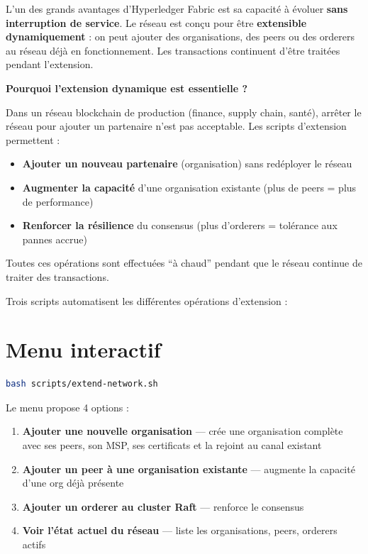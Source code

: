 \documentclass[12pt,a4paper,twoside]{report}
\begin{document}
L'un des grands avantages d'Hyperledger Fabric est sa capacité à évoluer \textbf{sans interruption de service}. Le réseau est conçu pour être \textbf{extensible dynamiquement} : on peut ajouter des organisations, des peers ou des orderers au réseau déjà en fonctionnement. Les transactions continuent d'être traitées pendant l'extension.

\begin{infobox}
\textbf{Pourquoi l'extension dynamique est essentielle ?}

Dans un réseau blockchain de production (finance, supply chain, santé), arrêter le réseau pour ajouter un partenaire n'est pas acceptable. Les scripts d'extension permettent :
\begin{itemize}
    \item \textbf{Ajouter un nouveau partenaire} (organisation) sans redéployer le réseau
    \item \textbf{Augmenter la capacité} d'une organisation existante (plus de peers = plus de performance)
    \item \textbf{Renforcer la résilience} du consensus (plus d'orderers = tolérance aux pannes accrue)
\end{itemize}
Toutes ces opérations sont effectuées ``à chaud'' pendant que le réseau continue de traiter des transactions.
\end{infobox}

Trois scripts automatisent les différentes opérations d'extension :

\section{Menu interactif}

\begin{lstlisting}[language=bash, caption=Script interactif d'extension]
bash scripts/extend-network.sh
\end{lstlisting}

Le menu propose 4 options :
\begin{enumerate}
    \item \textbf{Ajouter une nouvelle organisation} --- crée une organisation complète avec ses peers, son MSP, ses certificats et la rejoint au canal existant
    \item \textbf{Ajouter un peer à une organisation existante} --- augmente la capacité d'une org déjà présente
    \item \textbf{Ajouter un orderer au cluster Raft} --- renforce le consensus
    \item \textbf{Voir l'état actuel du réseau} --- liste les organisations, peers, orderers actifs
\end{enumerate}
\end{document}
